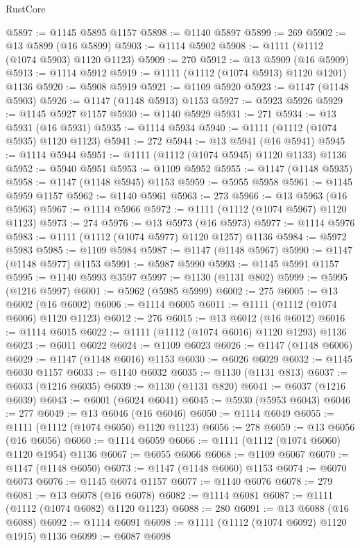 \begin{lexlean}{RustCore}
\begin{coremodule}
@5897 := @1145 @5895 @1157
@5898 := @1140 @5897
@5899 := 269
@5902 := @13 @5899 (@16 @5899)
@5903 := @1114 @5902
@5908 := @1111 (@1112 (@1074 @5903) @1120 @1123)
@5909 := 270
@5912 := @13 @5909 (@16 @5909)
@5913 := @1114 @5912
@5919 := @1111 (@1112 (@1074 @5913) @1120 @1201) @1136
@5920 := @5908 @5919
@5921 := @1109 @5920
@5923 := @1147 (@1148 @5903)
@5926 := @1147 (@1148 @5913) @1153
@5927 := @5923 @5926
@5929 := @1145 @5927 @1157
@5930 := @1140 @5929
@5931 := 271
@5934 := @13 @5931 (@16 @5931)
@5935 := @1114 @5934
@5940 := @1111 (@1112 (@1074 @5935) @1120 @1123)
@5941 := 272
@5944 := @13 @5941 (@16 @5941)
@5945 := @1114 @5944
@5951 := @1111 (@1112 (@1074 @5945) @1120 @1133) @1136
@5952 := @5940 @5951
@5953 := @1109 @5952
@5955 := @1147 (@1148 @5935)
@5958 := @1147 (@1148 @5945) @1153
@5959 := @5955 @5958
@5961 := @1145 @5959 @1157
@5962 := @1140 @5961
@5963 := 273
@5966 := @13 @5963 (@16 @5963)
@5967 := @1114 @5966
@5972 := @1111 (@1112 (@1074 @5967) @1120 @1123)
@5973 := 274
@5976 := @13 @5973 (@16 @5973)
@5977 := @1114 @5976
@5983 := @1111 (@1112 (@1074 @5977) @1120 @1257) @1136
@5984 := @5972 @5983
@5985 := @1109 @5984
@5987 := @1147 (@1148 @5967)
@5990 := @1147 (@1148 @5977) @1153
@5991 := @5987 @5990
@5993 := @1145 @5991 @1157
@5995 := @1140 @5993 @3597
@5997 := @1130 (@1131 @802)
@5999 := @5995 (@1216 @5997)
@6001 := @5962 (@5985 @5999)
@6002 := 275
@6005 := @13 @6002 (@16 @6002)
@6006 := @1114 @6005
@6011 := @1111 (@1112 (@1074 @6006) @1120 @1123)
@6012 := 276
@6015 := @13 @6012 (@16 @6012)
@6016 := @1114 @6015
@6022 := @1111 (@1112 (@1074 @6016) @1120 @1293) @1136
@6023 := @6011 @6022
@6024 := @1109 @6023
@6026 := @1147 (@1148 @6006)
@6029 := @1147 (@1148 @6016) @1153
@6030 := @6026 @6029
@6032 := @1145 @6030 @1157
@6033 := @1140 @6032
@6035 := @1130 (@1131 @813)
@6037 := @6033 (@1216 @6035)
@6039 := @1130 (@1131 @820)
@6041 := @6037 (@1216 @6039)
@6043 := @6001 (@6024 @6041)
@6045 := @5930 (@5953 @6043)
@6046 := 277
@6049 := @13 @6046 (@16 @6046)
@6050 := @1114 @6049
@6055 := @1111 (@1112 (@1074 @6050) @1120 @1123)
@6056 := 278
@6059 := @13 @6056 (@16 @6056)
@6060 := @1114 @6059
@6066 := @1111 (@1112 (@1074 @6060) @1120 @1954) @1136
@6067 := @6055 @6066
@6068 := @1109 @6067
@6070 := @1147 (@1148 @6050)
@6073 := @1147 (@1148 @6060) @1153
@6074 := @6070 @6073
@6076 := @1145 @6074 @1157
@6077 := @1140 @6076
@6078 := 279
@6081 := @13 @6078 (@16 @6078)
@6082 := @1114 @6081
@6087 := @1111 (@1112 (@1074 @6082) @1120 @1123)
@6088 := 280
@6091 := @13 @6088 (@16 @6088)
@6092 := @1114 @6091
@6098 := @1111 (@1112 (@1074 @6092) @1120 @1915) @1136
@6099 := @6087 @6098

\end{coremodule}
\end{lexlean}
